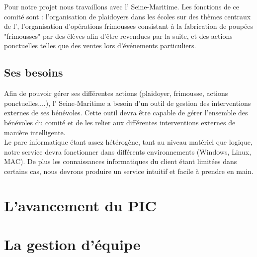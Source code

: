 \documentclass[asi]{picInsa}
\begin{document}
Pour notre projet nous travaillons avec l'\nomClient{} Seine-Maritime. Les fonctions de ce comité sont : l'organisation de plaidoyers dans les écoles sur des thèmes centraux de l'\nomClient, l'organisation d'opérations frimousses consistant à la fabrication de poupées "frimousses" par des élèves afin d'être revendues par la suite, et des actions ponctuelles telles que des ventes lors d’événements particuliers.

\section{Ses besoins}
Afin de pouvoir gérer ses différentes actions (plaidoyer, frimousse, actions ponctuelles,...), l'\nomClient{} Seine-Maritime a besoin d'un outil de gestion des interventions externes de ses bénévoles. Cette outil devra être capable de gérer l'ensemble des bénévoles du comité et de les relier aux différentes interventions externes de manière intelligente.\\
Le parc informatique étant assez hétérogène, tant au niveau matériel que logique, notre service devra fonctionner dans différents environnements (Windows, Linux, MAC). De plus les connaissances informatiques du client étant limitées dans certains cas, nous devrons produire un service intuitif et facile à prendre en main.





\chapter{L'avancement du PIC}
\label{avancement}





\chapter{La gestion d'équipe}
\label{gestion_equipe}

 
\begin{appendix}
\listoffigures
{}
	 
\listoftables
{}
\end{appendix}
\pageQuatriemeCouverture
\end{document}
